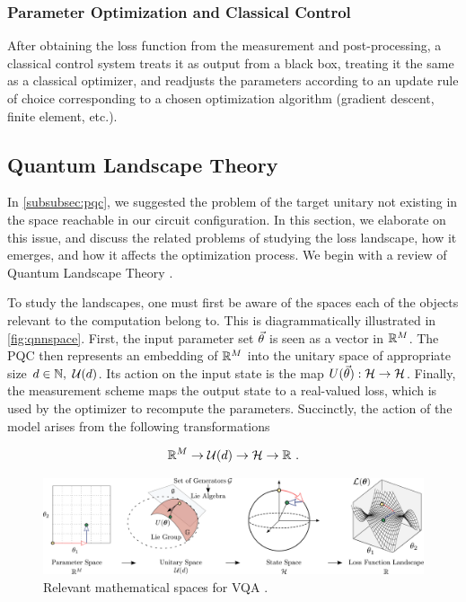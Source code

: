 \subsubsection{Parameter Optimization and Classical Control}

After obtaining the loss function from the measurement and post-processing, a
classical control system treats it as output from a black box, treating it the
same as a classical optimizer, and readjusts the parameters according to an
update rule of choice corresponding to a chosen optimization algorithm (gradient
descent, finite element, etc.). 

\subsection{Quantum Landscape Theory}
\label{subsec:quantlandscape}

In \autoref{subsubsec:pqc}, we suggested the problem of the target unitary not
existing in the space reachable in our circuit configuration. In this section,
we elaborate on this issue, and discuss the related problems of studying the
loss landscape, how it emerges, and how it affects the optimization process. We
begin with a review of Quantum Landscape Theory \cite[see][chapter
II.B]{larocca2021theory}.

To study the landscapes, one must first be aware of the spaces each of the
objects relevant to the computation belong to. This is diagrammatically
illustrated in \autoref{fig:qnnspace}. First, the input parameter set
\(\vec{\theta}\) is seen as a vector in \(\mathbb{R}^M\). The PQC then represents an
embedding of \(\mathbb{R}^M\) into the unitary space of appropriate size
\(d\in\mathbb{N},~ \mathcal{U}(d)\). Its action on the input state is the map
\(U(\vec{\theta}): \mathcal{H} \to \mathcal{H}\). Finally, the measurement
scheme maps the output state to a real-valued loss, which is used by the
optimizer to recompute the parameters. Succinctly, the action of the model
arises from the following transformations

\begin{gather}
    \mathbb{R}^M \to \mathcal{U}(d) \to \mathcal{H} \to \mathbb{R}~.
    \label{eq:transformations}
\end{gather}

\begin{figure}[!ht]
    \includegraphics[width=\textwidth]{figures/mapsurjective.pdf}
    \caption{Relevant mathematical spaces for VQA \cite[taken from][Figure
            2]{larocca2021theory}.}
    \label{fig:qnnspace}
\end{figure}

